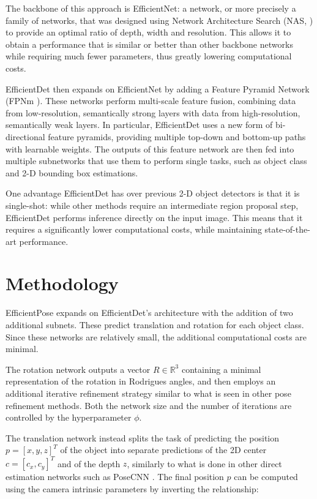 The backbone of this approach is EfficientNet: a network, or more precisely a family of networks, that was designed using Network Architecture Search (NAS, \cite{NAS}) to provide an optimal ratio of depth, width and resolution. This allows it to obtain a performance that is similar or better than other backbone networks while requiring much fewer parameters, thus greatly lowering computational costs.

EfficientDet then expands on EfficientNet by adding a Feature Pyramid Network (FPNm \cite{FPN}). These networks perform multi-scale feature fusion, combining data from low-resolution, semantically strong layers with data from high-resolution, semantically weak layers. In particular, EfficientDet uses a new form of bi-directional feature pyramids, providing multiple top-down and bottom-up paths with learnable weights. The outputs of this feature network are then fed into multiple subnetworks that use them to perform single tasks, such as object class and 2-D bounding box estimations.

One advantage EfficientDet has over previous 2-D object detectors is that it is single-shot: while other methods require an intermediate region proposal step, EfficientDet performs inference directly on the input image. This means that it requires a significantly lower computational costs, while maintaining state-of-the-art performance.

\section{Methodology}

EfficientPose expands on EfficientDet's architecture with the addition of two additional subnets. These predict translation and rotation for each object class. Since these networks are relatively small, the additional computational costs are minimal.

The rotation network outputs a vector $R \in \mathbb{R}^3$ containing a minimal representation of the rotation in Rodrigues angles, and then employs an additional iterative refinement strategy similar to what is seen in other pose refinement methods. Both the network size and the number of iterations are controlled by the hyperparameter $\phi$.

The translation network instead splits the task of predicting the position $p=[x, y, z]^T$ of the object into separate predictions of the 2D center $c = [c_x, c_y]^T$ and of the depth $z$, similarly to what is done in other direct estimation networks such as PoseCNN \cite{PoseCNN}. The final position $p$ can be computed using the camera intrinsic parameters by inverting the relationship:


